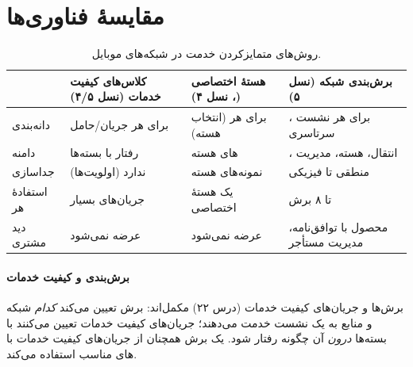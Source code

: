 \documentclass[11pt,a4paper]{article}
\begin{document}
\section{مقایسهٔ فناوری‌ها}
\begin{table}[htbp]
\centering\small
\caption{روش‌های متمایزکردن خدمت در شبکه‌های موبایل.}\label{tab:cmp}
\begin{tabularx}{\linewidth}{@{}l Y Y Y@{}}
\toprule
{} & کلاس‌های کیفیت خدمات (نسل ۴/۵) & هستهٔ اختصاصی (، نسل ۴) & برش‌بندی شبکه (نسل ۵) \\
\midrule
دانه‌بندی     & برای هر جریان/حامل          & برای هر  (انتخاب هسته) & برای هر نشست ، سرتاسری \\
دامنه         & رفتار با بسته‌ها            & های هسته              & ، انتقال، هسته، مدیریت \\
جداسازی       & ندارد (اولویت‌ها)           & نمونه‌های هسته                  & منطقی تا فیزیکی \\
استفادهٔ هر  & جریان‌های بسیار     & یک هستهٔ اختصاصی              & تا ۸ برش \\
دید مشتری     & عرضه نمی‌شود                & عرضه نمی‌شود                    & محصول با توافق‌نامه، مدیریت مستأجر \\
\bottomrule
\end{tabularx}
\end{table}

\paragraph{برش‌بندی و کیفیت خدمات} برش‌ها و جریان‌های کیفیت خدمات (درس ۲۲) مکمل‌اند: برش تعیین می‌کند \emph{کدام} شبکه و منابع به یک نشست
خدمت می‌دهند؛ جریان‌های کیفیت خدمات تعیین می‌کنند با بسته‌ها \emph{درون} آن چگونه رفتار شود. یک برش  همچنان از جریان‌های کیفیت
خدمات با های مناسب استفاده می‌کند.

\end{document}
